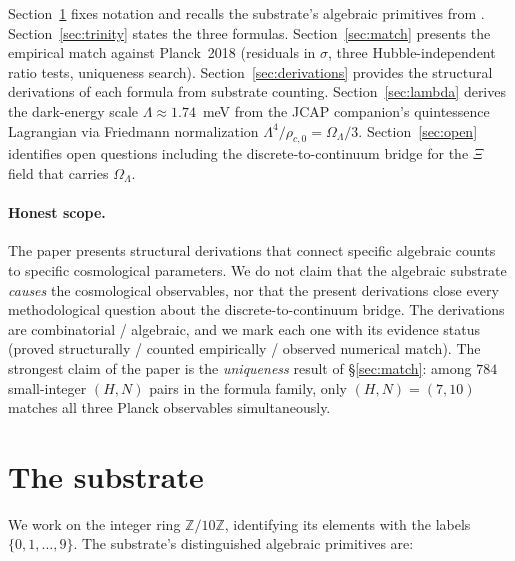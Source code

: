 \documentclass[11pt,reqno]{amsart}
\theoremstyle{plain}
\theoremstyle{definition}
\theoremstyle{remark}
\newcommand{\Z}{\mathbb{Z}}
\begin{document}
Section~\ref{sec:setup} fixes notation and recalls the substrate's
algebraic primitives from \cite{SandersGish2026FourCore,
SandersGish2026JCAP}. Section~\ref{sec:trinity} states
the three formulas. Section~\ref{sec:match} presents the empirical
match against Planck~2018 (residuals in $\sigma$, three
Hubble-independent ratio tests, uniqueness search).
Section~\ref{sec:derivations} provides the structural derivations
of each formula from substrate counting.
Section~\ref{sec:lambda} derives the dark-energy scale
$\Lambda \approx 1.74$~meV from the JCAP companion's
quintessence Lagrangian via Friedmann normalization
$\Lambda^{4}/\rho_{c,0} = \Omega_\Lambda/3$. Section~\ref{sec:open}
identifies open questions including the discrete-to-continuum
bridge for the $\Xi$ field that carries $\Omega_\Lambda$.

\paragraph{Honest scope.} The paper presents structural
derivations that connect specific algebraic counts to specific
cosmological parameters. We do not claim that the algebraic
substrate \emph{causes} the cosmological observables, nor that
the present derivations close every methodological question
about the discrete-to-continuum bridge. The derivations are
combinatorial / algebraic, and we mark each one with its evidence
status (proved structurally / counted empirically / observed
numerical match). The strongest claim of the paper is the
\emph{uniqueness} result of \S\ref{sec:match}: among $784$
small-integer $(H, N)$ pairs in the formula family, only
$(H, N) = (7, 10)$ matches all three Planck observables
simultaneously.

\section{The substrate}\label{sec:setup}

We work on the integer ring $\Z/10\Z$, identifying its elements
with the labels $\{0, 1, \dots, 9\}$. The substrate's
distinguished algebraic primitives are:
\end{document}
